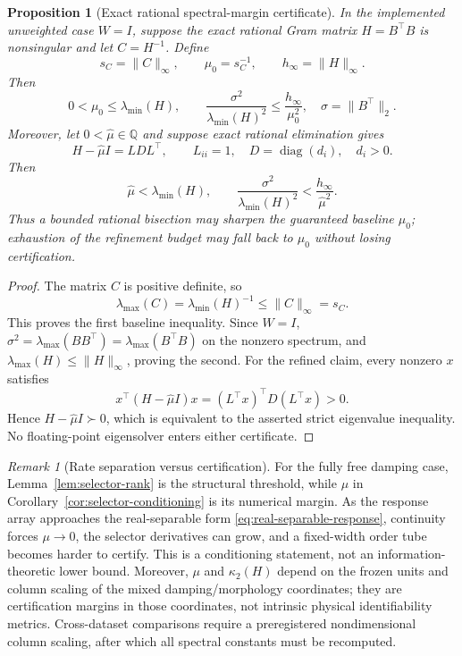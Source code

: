 \documentclass[11pt]{article}
\newtheorem{proposition}[theorem]{Proposition}
\theoremstyle{definition}
\theoremstyle{remark}
\newtheorem{remark}[theorem]{Remark}
\begin{document}
\begin{proposition}[Exact rational spectral-margin certificate]
\label{prop:exact-spectral-margin}
In the implemented unweighted case \(W=I\), suppose the exact rational
Gram matrix \(H=B^\top B\) is nonsingular and let \(C=H^{-1}\).  Define
\[
 s_C=\lVert C\rVert_\infty,\qquad
 \mu_0=s_C^{-1},\qquad h_\infty=\lVert H\rVert_\infty.
\]
Then
\begin{equation}
 0<\mu_0\le\lambda_{\min}(H),\qquad
 \frac{\sigma^2}{\lambda_{\min}(H)^2}
 \le \frac{h_\infty}{\mu_0^2},
 \quad \sigma=\lVert B^\top\rVert_2.
 \label{eq:exact-spectral-baseline}
\end{equation}
Moreover, let \(0<\widehat\mu\in\mathbb Q\) and suppose exact rational
elimination gives
\[
 H-\widehat\mu I=LDL^\top,\qquad
 L_{ii}=1,\quad D=\operatorname{diag}(d_i),\quad d_i>0.
\]
Then
\[
 \widehat\mu<\lambda_{\min}(H),\qquad
 \frac{\sigma^2}{\lambda_{\min}(H)^2}
 <\frac{h_\infty}{\widehat\mu^2}.
\]
Thus a bounded rational bisection may sharpen the guaranteed baseline
\(\mu_0\); exhaustion of the refinement budget may fall back to \(\mu_0\)
without losing certification.
\end{proposition}
\begin{proof}
The matrix \(C\) is positive definite, so
\[
 \lambda_{\max}(C)=\lambda_{\min}(H)^{-1}
 \le\lVert C\rVert_\infty=s_C.
\]
This proves the first baseline inequality.  Since \(W=I\),
\(\sigma^2=\lambda_{\max}(BB^\top)=\lambda_{\max}(B^\top B)\)
on the nonzero spectrum, and
\(\lambda_{\max}(H)\le\lVert H\rVert_\infty\), proving the second.
For the refined claim, every nonzero \(x\) satisfies
\[
 x^\top(H-\widehat\mu I)x
 =(L^\top x)^\top D(L^\top x)>0.
\]
Hence \(H-\widehat\mu I\succ0\), which is equivalent to the asserted
strict eigenvalue inequality.  No floating-point eigensolver enters either
certificate.
\end{proof}

\begin{remark}[Rate separation versus certification]
For the fully free damping case, Lemma~\ref{lem:selector-rank} is the
structural threshold, while \(\mu\) in
Corollary~\ref{cor:selector-conditioning} is its numerical margin.  As the
response array approaches the real-separable form
\eqref{eq:real-separable-response}, continuity forces
\(\mu\to0\), the selector derivatives can grow, and a fixed-width order tube
becomes harder to certify.  This is a conditioning statement, not an
information-theoretic lower bound.  Moreover, \(\mu\) and
\(\kappa_2(H)\) depend on the frozen units and column scaling of the mixed
damping/morphology coordinates; they are certification margins in those
coordinates, not intrinsic physical identifiability metrics.  Cross-dataset
comparisons require a preregistered nondimensional column scaling, after
which all spectral constants must be recomputed.
\end{remark}
\end{document}
